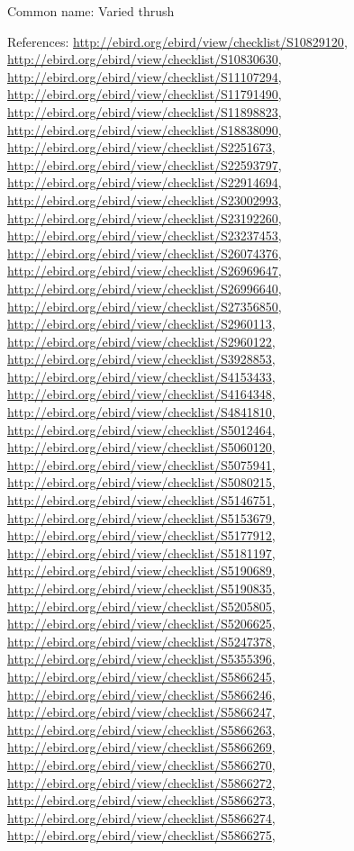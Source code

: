 \documentclass[9pt, article]{memoir}
\begin{document}
\begin{multicols}{2}
Common name: Varied thrush

References: 
\url{http://ebird.org/ebird/view/checklist/S10829120}, 
\url{http://ebird.org/ebird/view/checklist/S10830630}, 
\url{http://ebird.org/ebird/view/checklist/S11107294}, 
\url{http://ebird.org/ebird/view/checklist/S11791490}, 
\url{http://ebird.org/ebird/view/checklist/S11898823}, 
\url{http://ebird.org/ebird/view/checklist/S18838090}, 
\url{http://ebird.org/ebird/view/checklist/S2251673}, 
\url{http://ebird.org/ebird/view/checklist/S22593797}, 
\url{http://ebird.org/ebird/view/checklist/S22914694}, 
\url{http://ebird.org/ebird/view/checklist/S23002993}, 
\url{http://ebird.org/ebird/view/checklist/S23192260}, 
\url{http://ebird.org/ebird/view/checklist/S23237453}, 
\url{http://ebird.org/ebird/view/checklist/S26074376}, 
\url{http://ebird.org/ebird/view/checklist/S26969647}, 
\url{http://ebird.org/ebird/view/checklist/S26996640}, 
\url{http://ebird.org/ebird/view/checklist/S27356850}, 
\url{http://ebird.org/ebird/view/checklist/S2960113}, 
\url{http://ebird.org/ebird/view/checklist/S2960122}, 
\url{http://ebird.org/ebird/view/checklist/S3928853}, 
\url{http://ebird.org/ebird/view/checklist/S4153433}, 
\url{http://ebird.org/ebird/view/checklist/S4164348}, 
\url{http://ebird.org/ebird/view/checklist/S4841810}, 
\url{http://ebird.org/ebird/view/checklist/S5012464}, 
\url{http://ebird.org/ebird/view/checklist/S5060120}, 
\url{http://ebird.org/ebird/view/checklist/S5075941}, 
\url{http://ebird.org/ebird/view/checklist/S5080215}, 
\url{http://ebird.org/ebird/view/checklist/S5146751}, 
\url{http://ebird.org/ebird/view/checklist/S5153679}, 
\url{http://ebird.org/ebird/view/checklist/S5177912}, 
\url{http://ebird.org/ebird/view/checklist/S5181197}, 
\url{http://ebird.org/ebird/view/checklist/S5190689}, 
\url{http://ebird.org/ebird/view/checklist/S5190835}, 
\url{http://ebird.org/ebird/view/checklist/S5205805}, 
\url{http://ebird.org/ebird/view/checklist/S5206625}, 
\url{http://ebird.org/ebird/view/checklist/S5247378}, 
\url{http://ebird.org/ebird/view/checklist/S5355396}, 
\url{http://ebird.org/ebird/view/checklist/S5866245}, 
\url{http://ebird.org/ebird/view/checklist/S5866246}, 
\url{http://ebird.org/ebird/view/checklist/S5866247}, 
\url{http://ebird.org/ebird/view/checklist/S5866263}, 
\url{http://ebird.org/ebird/view/checklist/S5866269}, 
\url{http://ebird.org/ebird/view/checklist/S5866270}, 
\url{http://ebird.org/ebird/view/checklist/S5866272}, 
\url{http://ebird.org/ebird/view/checklist/S5866273}, 
\url{http://ebird.org/ebird/view/checklist/S5866274}, 
\url{http://ebird.org/ebird/view/checklist/S5866275}, 

\end{multicols}
\end{document}
